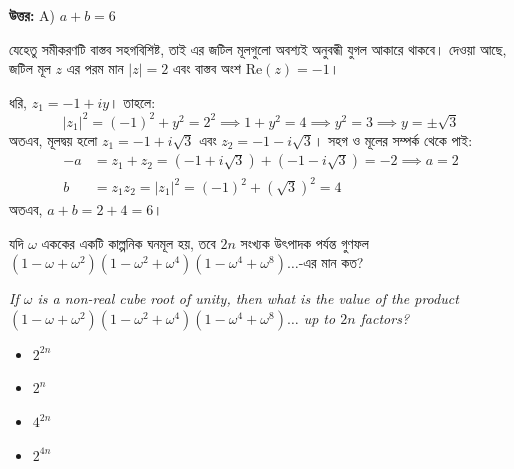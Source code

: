 \documentclass[12pt, a4paper]{article}
\begin{document}
\vspace{0.5em}
\begin{tcolorbox}[answerbox]
    \textbf{\color{success} উত্তর:} A) $a+b = 6$
\end{tcolorbox}
\vspace{1em}

\begin{tcolorbox}[solutionbox={সমাধান (Solution)}]
    \noindent
    যেহেতু সমীকরণটি বাস্তব সহগবিশিষ্ট, তাই এর জটিল মূলগুলো অবশ্যই অনুবন্ধী যুগল আকারে থাকবে। দেওয়া আছে, জটিল মূল $z$ এর পরম মান $|z| = 2$ এবং বাস্তব অংশ $\text{Re}(z) = -1$। 
    
    \vspace{0.5em}
    ধরি, $z_1 = -1 + iy$। তাহলে:
    \[ |z_1|^2 = (-1)^2 + y^2 = 2^2 \implies 1 + y^2 = 4 \implies y^2 = 3 \implies y = \pm \sqrt{3} \]
    অতএব, মূলদ্বয় হলো $z_1 = -1 + i\sqrt{3}$ এবং $z_2 = -1 - i\sqrt{3}$। সহগ ও মূলের সম্পর্ক থেকে পাই:
    \begin{align*}
        -a &= z_1 + z_2 = (-1 + i\sqrt{3}) + (-1 - i\sqrt{3}) = -2 \implies a = 2 \\
        b &= z_1 z_2 = |z_1|^2 = (-1)^2 + (\sqrt{3})^2 = 4
    \end{align*}
    অতএব, $a+b = 2 + 4 = 6$।
\end{tcolorbox}
\vspace{1em}

\begin{tcolorbox}[questionbox={প্রশ্ন (Question) 49}]
    \noindent
    যদি $\omega$ এককের একটি কাল্পনিক ঘনমূল হয়, তবে $2n$ সংখ্যক উৎপাদক পর্যন্ত গুণফল $(1-\omega+\omega^2)(1-\omega^2+\omega^4)(1-\omega^4+\omega^8)\dots$-এর মান কত?
    
    \vspace{0.8em}
    \begin{english}
    \noindent\textit{\color{darkgray}
    If $\omega$ is a non-real cube root of unity, then what is the value of the product $(1-\omega+\omega^2)(1-\omega^2+\omega^4)(1-\omega^4+\omega^8)\dots$ up to $2n$ factors?
    }
    \end{english}
\end{tcolorbox}

\begin{itemize}[label={}, leftmargin=1cm, itemsep=0.5em]
    \item[\textbf{A)}] $2^{2n}$
    \item[\textbf{B)}] $2^{n}$
    \item[\textbf{C)}] $4^{2n}$
    \item[\textbf{D)}] $2^{4n}$
\end{itemize}
\end{document}
